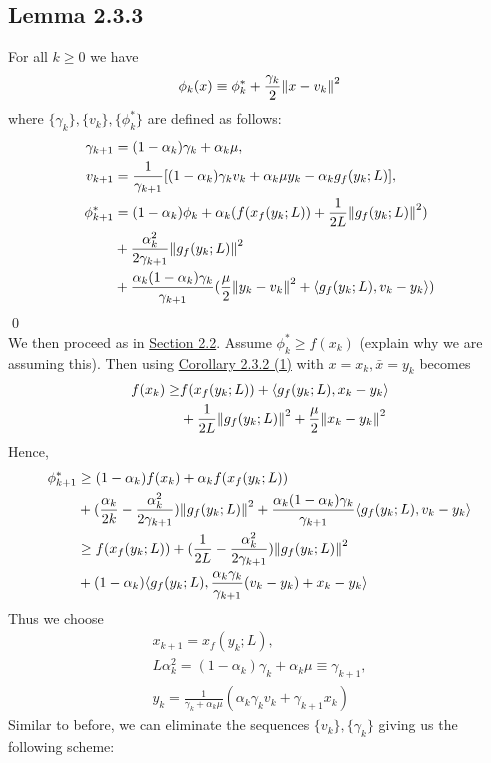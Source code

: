 \documentclass[12pt,a4paper]{article}
\begin{document}
	\subsection*{Lemma 2.3.3}\label{lem233}
	For all $k \geq 0$ we have
	\begin{align*}
		\phi_k(x) \equiv \phi_k^* + \frac{\gamma_k}{2}\norm{x - v_k}^2
	\end{align*}
	where $\{\gamma_k\},\{v_k\},\{\phi_k^*\}$ are defined as follows:
	\begin{align*}
		\gamma_{k+1} &= (1 - \alpha_k)\gamma_k + \alpha_k\mu,	\\
		v_{k+1} &= \frac{1}{\gamma_{k+1}}[(1 - \alpha_k)\gamma_kv_k + \alpha_k\mu y_k - \alpha_kg_f(y_k;L)], \\
		\phi_{k+1}^* &= ( 1 - \alpha_k)\phi_k + \alpha_k ( f(x_f(y_k;L)) + \frac{1}{2L}\norm{g_f(y_k;L)}^2) \\
		&+ \frac{\alpha_k^2}{2\gamma_{k+1}}\norm{g_f(y_k;L)}^2 \\
		&+ \frac{\alpha_k(1 - \alpha_k)\gamma_k}{\gamma_{k+1}}(\frac{\mu}{2}\norm{y_k - v_k}^2 + \langle g_f(y_k;L), v_k - y_k \rangle)
	\end{align*}
	\qed \\
	We then proceed as in \hyperref[sec22]{Section 2.2}. Assume $\phi_k^* \geq f(x_k)$ (explain why we are assuming this). Then using \hyperref[cor232_1]{Corollary 2.3.2 (1)} with $x = x_k, \bar{x} = y_k$ becomes
	\begin{align*}
		f(x_k) \geq &f(x_f(y_k;L)) + \langle g_f(y_k;L),x_k - y_k \rangle \\
		&+\frac{1}{2L}\norm{g_f(y_k;L)}^2 + \frac{\mu}{2}\norm{x_k - y_k}^2
	\end{align*}
	Hence, 
	\begin{align*}
		\phi_{k+1}^* &\geq (1 - \alpha_k)f(x_k) + \alpha_kf(x_f(y_k;L)) \\
		&+(\frac{\alpha_k}{2k} - \frac{\alpha_k^2}{2\gamma_{k+1}})\norm{g_f(y_k;L)}^2 + \frac{\alpha_k(1 - \alpha_k)\gamma_k}{\gamma_{k+1}}\langle g_f(y_k;L), v_k - y_k \rangle \\
		&\geq f(x_f(y_k;L)) + (\frac{1}{2L} - \frac{\alpha_k^2}{2\gamma_{k+1}})\norm{g_f(y_k;L)}^2 \\
		&+(1 - \alpha_k)\langle g_f(y_k;L),\frac{\alpha_k\gamma_k}{\gamma_{k+1}}(v_k - y_k) + x_k - y_k \rangle
	\end{align*}
	Thus we choose
	\begin{align*}
		x_{k+1} = x_f(y_k;L), \\
		L\alpha_k^2 = (1 - \alpha_k)\gamma_k + \alpha_k \mu \equiv \gamma_{k+1}, \\
		y_k = \frac{1}{\gamma_k + \alpha_k\mu}(\alpha_k\gamma_kv_k + \gamma_{k+1}x_k)
	\end{align*}
	Similar to before, we can eliminate the sequences $\{v_k\}, \{\gamma_k\}$ giving us the following scheme:
\end{document}
